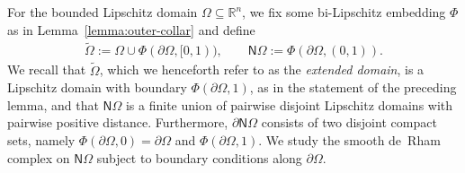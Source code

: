 \documentclass[10pt,a4paper]{amsart}
\theoremstyle{definition}
\theoremstyle{remark}
\numberwithin{equation}{section}
\newcommand{\bbR}{{\mathbb R}}
\newcommand{\sfN}{{\mathsf N}}
\newcommand{\Domain}{{\Omega}}
\newcommand{\collaredDomain}{{\widetilde\Omega}}
\newcommand{\Collar}{{\sfN\Omega}}
\begin{document}
For the bounded Lipschitz domain $\Domain \subseteq \bbR^{n}$,
we fix some bi-Lipschitz embedding $\Phi$ as in Lemma~\ref{lemma:outer-collar} and define
\begin{align*}
    \collaredDomain := \Domain \cup \Phi( \partial\Domain, [0,1) ),
    \qquad 
    \Collar := \Phi( \partial\Domain, (0,1) ).
\end{align*}
We recall that $\collaredDomain$, which we henceforth refer to as the \emph{extended domain}, 
is a Lipschitz domain with boundary $\Phi( \partial\Domain,1)$,
as in the statement of the preceding lemma, 
and that $\Collar$ is a finite union of pairwise disjoint Lipschitz domains with pairwise positive distance.
Furthermore, $\partial\Collar$ consists of two disjoint compact sets, 
namely $\Phi( \partial\Domain, 0 ) = \partial\Domain$ and $\Phi( \partial\Domain, 1 )$.
We study the smooth de~Rham complex on $\Collar$ subject to boundary conditions along $\partial\Domain$. 
\end{document}
